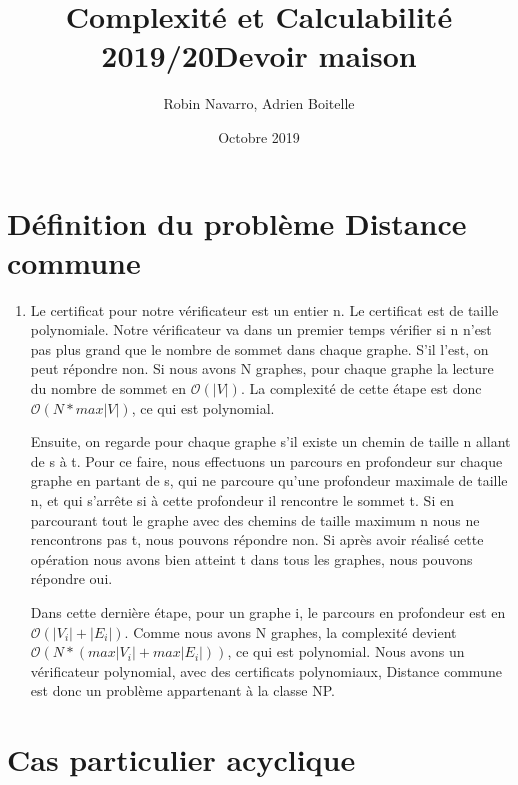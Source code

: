 \documentclass{article}
\title{Complexité et Calculabilité 2019/20\newline Devoir maison}
\author{Robin Navarro, Adrien Boitelle}
\date{Octobre 2019}
\begin{document}
\maketitle

\section{Définition du problème Distance commune}

\begin{enumerate}
\item 
Le certificat pour notre vérificateur est un entier n. Le certificat est de taille polynomiale.\newline
Notre vérificateur va dans un premier temps vérifier si n n'est pas plus grand que le nombre de sommet dans chaque graphe. S'il l'est, on peut répondre non. Si nous avons N graphes, pour chaque graphe la lecture du nombre de sommet en $\mathcal{O}(|V|)$. La complexité de cette étape est donc $\mathcal{O}(N * max|V|)$, ce qui est polynomial. \newline

Ensuite, on regarde pour chaque graphe s'il existe un chemin de taille n  allant de s à t. Pour ce faire, nous effectuons un parcours en profondeur sur chaque graphe en partant de s, qui ne parcoure qu'une profondeur maximale de taille n, et qui s'arrête si à cette profondeur il rencontre le sommet t. Si en parcourant tout le graphe avec des chemins de taille maximum n nous ne rencontrons pas t, nous pouvons répondre non. Si après avoir réalisé cette opération nous avons bien atteint t dans tous les graphes, nous pouvons répondre oui.\newline

Dans cette dernière étape, pour un graphe i, le parcours en profondeur est en $\mathcal{O}(|V_i| + |E_i|)$. Comme nous avons N graphes, la complexité devient $\mathcal{O}(N * (max|V_i| + max|E_i|))$, ce qui est polynomial. Nous avons un vérificateur polynomial, avec des certificats polynomiaux, Distance commune est donc un problème appartenant à la classe NP.
\end{enumerate}
\newpage
\section{Cas particulier acyclique}
\end{document}
